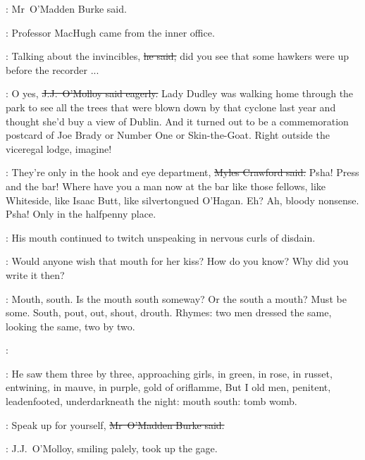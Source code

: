 :
Mr~O'Madden Burke said.

:
Professor MacHugh came from the inner office.

\machugh:
Talking about the invincibles,
\sout{he said,}
did you see that some hawkers were up before the recorder ...

\jjom:
O yes,
\sout{J.J.~O'Molloy said eagerly.}
Lady Dudley was walking home through the park
to see all the trees that were blown down by that cyclone last year
and thought she'd buy a view of Dublin.
And it turned out to be a commemoration postcard
of Joe Brady or Number One or Skin-the-Goat.
Right outside the viceregal lodge,
imagine!

\crawford:
They're only in the hook and eye department,
\sout{Myles Crawford said.}
Psha!
Press and the bar!
Where have you a man now at the bar like those fellows,
like Whiteside,
like Isaac Butt,
like silvertongued O'Hagan.
Eh?
Ah, bloody nonsense.
Psha!
Only in the halfpenny place.

:
His mouth continued to twitch unspeaking
in nervous curls of disdain.%

\StephenInt:
Would anyone wish that mouth for her kiss?
How do you know?
Why did you write it then?



\StephenInt:
Mouth, south.
Is the mouth south someway?
Or the south a mouth?
Must be some.
South,
pout,
out,
shout,
drouth.
Rhymes:
two men dressed the same,
looking the same,
two by two.

\StephenInt:

\StephenInt:
He saw them three by three,
approaching girls,
in green,
in rose,
in russet,
entwining,
in mauve,
in purple,
gold of oriflamme,
But I old men,
penitent,
leadenfooted,
underdarkneath the night:
mouth south:
tomb womb.

\omaddenburke:
Speak up for yourself,
\sout{Mr~O'Madden Burke said.}



:
J.J.~O'Molloy,
smiling palely,
took up the gage.

